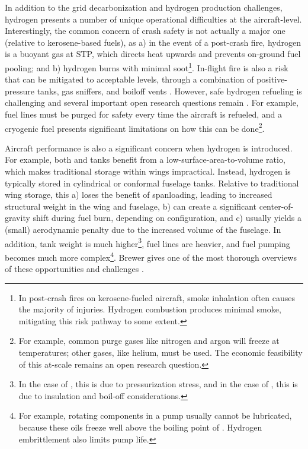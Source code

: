 In addition to the grid decarbonization and hydrogen production challenges, hydrogen presents a number of unique operational difficulties at the aircraft-level. Interestingly, the common concern of crash safety is not actually a major one (relative to kerosene-based fuels), as a) in the event of a post-crash fire, hydrogen is a buoyant gas at STP, which directs heat upwards and prevents on-ground fuel pooling; and b) hydrogen burns with minimal soot\footnote{In post-crash fires on kerosene-fueled aircraft, smoke inhalation often causes the majority of injuries. Hydrogen combustion produces minimal smoke, mitigating this risk pathway to some extent.}. In-flight fire is also a risk that can be mitigated to acceptable levels, through a combination of positive-pressure tanks, gas sniffers, and boiloff vents \cite{brewer_hydrogen_1991}. However, safe hydrogen refueling is challenging and several important open research questions remain \cite{gaubatz_estimating_2023}. For example, fuel lines must be purged for safety every time the aircraft is refueled, and a cryogenic fuel presents significant limitations on how this can be done\footnote{For example, common purge gases like nitrogen and argon will freeze at \lh temperatures; other gases, like helium, must be used. The economic feasibility of this at-scale remains an open research question.}.

Aircraft performance is also a significant concern when hydrogen is introduced. For example, both \lh and \gh tanks benefit from a low-surface-area-to-volume ratio, which makes traditional storage within wings impractical. Instead, hydrogen is typically stored in cylindrical or conformal fuselage tanks. Relative to traditional wing storage, this a) loses the benefit of spanloading, leading to increased structural weight in the wing and fuselage, b) can create a significant center-of-gravity shift during fuel burn, depending on configuration, and c) usually yields a (small) aerodynamic penalty due to the increased volume of the fuselage. In addition, tank weight is much higher\footnote{In the case of \gh, this is due to pressurization stress, and in the case of \lh, this is due to insulation and boil-off considerations.}, fuel lines are heavier, and fuel pumping becomes much more complex\footnote{For example, rotating components in a pump usually cannot be lubricated, because these oils freeze well above the boiling point of \lh. Hydrogen embrittlement also limits pump life.}. Brewer gives one of the most thorough overviews of these opportunities and challenges \cite{brewer_hydrogen_1991}.

